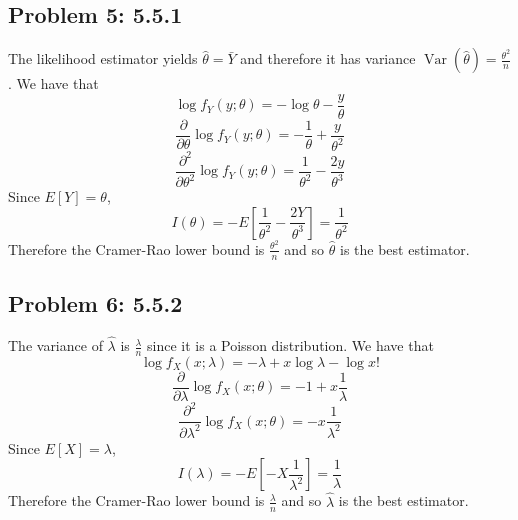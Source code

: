 \documentclass{article}
\newcommand{\var}{\operatorname{Var}}
\begin{document}
\subsection*{Problem 5: 5.5.1}

The likelihood estimator yields $\hat{\theta} = \bar{Y}$ 
and therefore it has variance $\var(\hat{\theta}) = \frac{\theta^2}{n}$.
We have that
\[
	\log f_Y(y;\theta) = -\log \theta - \frac{y}{\theta}
\]
\[
	\frac{\partial}{\partial \theta} \log f_Y(y;\theta)
	= -\frac{1}{\theta} + \frac{y}{\theta^2}
\]
\[
	\frac{\partial^2}{\partial \theta^2} \log f_Y(y;\theta)
	= \frac{1}{\theta^2} - \frac{2y}{\theta^3}
\]
Since $E[Y] = \theta$, 
\[
	I(\theta) = -E\left[\frac{1}{\theta^2} - \frac{2Y}{\theta^3}\right]
	= \frac{1}{\theta^2}
\]
Therefore the Cramer-Rao lower bound is $\frac{\theta^2}{n}$
and so $\hat{\theta}$ is the best estimator.
\newpage
\subsection*{Problem 6: 5.5.2}

The variance of $\hat{\lambda}$ is $\frac{\lambda}{n}$ since it is a Poisson distribution.
We have that
\[
	\log f_X(x;\lambda) = -\lambda + x \log \lambda - \log x!
\]
\[
	\frac{\partial}{\partial \lambda} \log f_X(x;\theta)
	= -1 + x\frac{1}{\lambda}
\]
\[
	\frac{\partial^2}{\partial \lambda^2} \log f_X(x;\theta)
	= -x\frac{1}{\lambda^2}
\]
Since $E[X] = \lambda$,
\[
	I(\lambda) = - E[-X\frac{1}{\lambda^2}]
	= \frac{1}{\lambda}
\]
Therefore the Cramer-Rao lower bound is $\frac{\lambda}{n}$
and so $\hat{\lambda}$ is the best estimator.
\end{document}
